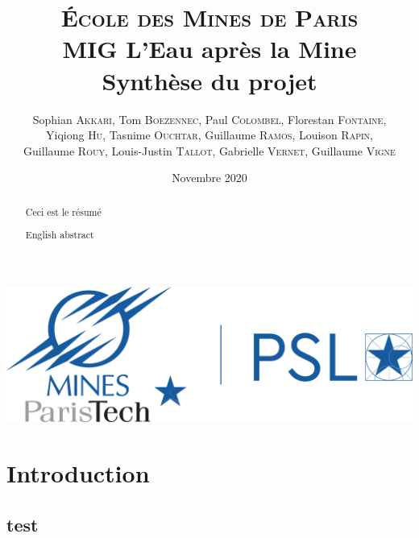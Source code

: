 \documentclass{article}
\title{\textbf{\LARGE{\textsc{École des Mines de Paris}}\\ \vspace{1 cm}MIG L'Eau après la Mine\\\vspace{0.8 cm}Synthèse du projet}\vspace{1 cm}}
\author{Sophian \textsc{Akkari}, Tom \textsc{Boezennec}, Paul \textsc{Colombel}, Florestan \textsc{Fontaine},\\ Yiqiong \textsc{Hu}, Tasnime \textsc{Ouchtar}, Guillaume \textsc{Ramos}, Louison \textsc{Rapin},\\ Guillaume \textsc{Rouy},  Louis-Justin \textsc{Tallot}, Gabrielle \textsc{Vernet}, Guillaume \textsc{Vigne}\\ }
\date{\vspace{1 cm}Novembre 2020}
\begin{document}
\maketitle
\thispagestyle{empty}
\vspace{5 cm}
\begin{center}
    \includegraphics[width = 0.4\linewidth]{logoMPT.png}
\end{center}


\newpage

\tableofcontents

\newpage

\begin{abstract}
    Ceci est le résumé
\end{abstract}

{
\begin{abstract}
    English abstract
\end{abstract}
}

\newpage
{}
\section{Introduction}
\subsection{test}
\Blindtext
\end{document}
